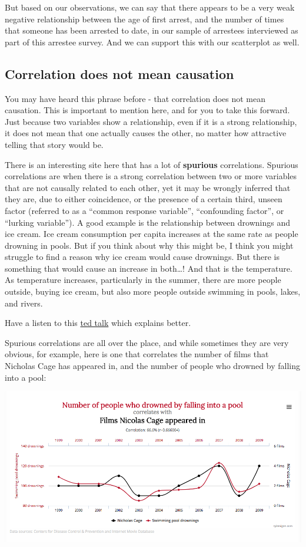 \documentclass[
]{book}
\begin{document}
But based on our observations, we can say that there appears to be a very weak negative relationship between the age of first arrest, and the number of times that someone has been arrested to date, in our sample of arrestees interviewed as part of this arrestee survey. And we can support this with our scatterplot as well.

\hypertarget{correlation-does-not-mean-causation}{%
\subsection{Correlation does not mean causation}\label{correlation-does-not-mean-causation}}

You may have heard this phrase before - that correlation does not mean causation. This is important to mention here, and for you to take this forward. Just because two variables show a relationship, even if it is a strong relationship, it does not mean that one actually causes the other, no matter how attractive telling that story would be.

There is an interesting site here that has a lot of \textbf{spurious} correlations. Spurious correlations are when there is a strong correlation between two or more variables that are not causally related to each other, yet it may be wrongly inferred that they are, due to either coincidence, or the presence of a certain third, unseen factor (referred to as a ``common response variable'', ``confounding factor'', or ``lurking variable''). A good example is the relationship between drownings and ice cream. Ice cream consumption per capita increases at the same rate as people drowning in pools. But if you think about why this might be, I think you might struggle to find a reason why ice cream would cause drownings. But there is something that would cause an increase in both\ldots! And that is the temperature. As temperature increases, particularly in the summer, there are more people outside, buying ice cream, but also more people outside swimming in pools, lakes, and rivers.

Have a listen to this \href{https://www.youtube.com/watch?v=8B271L3NtAw}{ted talk} which explains better.

Spurious correlations are all over the place, and while sometimes they are very obvious, for example, here is one that correlates the number of films that Nicholas Cage has appeared in, and the number of people who drowned by falling into a pool:

\includegraphics{imgs/supr_corr.png}
\end{document}
